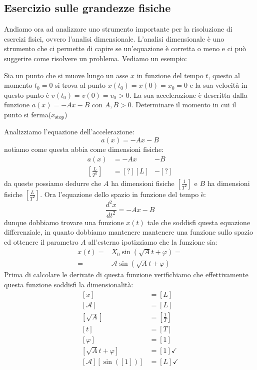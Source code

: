     \subsection{Esercizio sulle grandezze fisiche}
        Andiamo ora ad analizzare uno strumento importante per la risoluzione di esercizi fisici, ovvero l'analisi dimensionale. L'analisi dimensionale è uno strumento che ci permette di capire se un'equazione è corretta o meno e ci può suggerire come risolvere un problema. Vediamo un esempio:
        \begin{problem}
            Sia un punto che si muove lungo un asse $x$ in funzione del tempo $t$, questo al momento $t_0=0$ si trova al punto $x(t_0)=x(0)=x_0=0$ e la sua velocità in questo punto è $v(t_0)=v(0)=v_0>0$. La sua accelerazione è descritta dalla funzione $a(x)=-Ax-B$ con $A,B>0$.\newline
            Determinare il momento in cui il punto si ferma($x_{\text{stop}}$)
        \end{problem}
        Analizziamo l'equazione dell'accelerazione:
        $$
            a(x) = -Ax-B
        $$
        notiamo come questa abbia come dimensioni fisiche:
        $$
            \begin{aligned}
                a(x) &= -Ax&-B\\
                \left[\frac{L}{T^2}\right] &= \left[?\right]\left[L\right]&-\left[?\right]
            \end{aligned}
        $$
        da queste possiamo dedurre che $A$ ha dimensioni fisiche $\left[\frac{1}{T^2}\right]$ e $B$ ha dimensioni fisiche $\left[\frac{L}{T^2}\right]$. Ora l'equazione dello spazio in funzione del tempo è: $$
            \frac{d^2x}{dt^2}=-Ax-B
        $$
        dunque dobbiamo trovare una funzione $x(t)$ tale che soddisfi questa equazione differenziale, in quanto dobbiamo mantenere mantenere una funzione sullo spazio ed ottenere il parametro $A$ all'esterno ipotizziamo che la funzione sia:
        $$  
            \begin{aligned}
                x(t)=&X_0\sin(\sqrt{A}t + \varphi) = \\
                =& \mathcal{A}\sin(\sqrt{A}t + \varphi)
            \end{aligned}
        $$
        Prima di calcolare le derivate di questa funzione verifichiamo che effettivamente questa funzione soddisfi la dimensionalità:
        $$
            \begin{aligned}
                \left[x\right] &= \left[L\right]\\
                \left[\mathcal{A}\right] &= \left[L\right]\\
                \left[\sqrt{A}\right] &= \left[\frac{1}{T}\right]\\
                \left[t\right] &= \left[T\right]\\
                \left[\varphi\right] &= \left[1\right]\\
                \left[\sqrt{A}t + \varphi\right] &= \left[1\right]\checkmark\\
                \left[\mathcal{A}\right]\left[\sin(\left[1\right])\right]&=\left[L\right]\checkmark
            \end{aligned}
        $$
